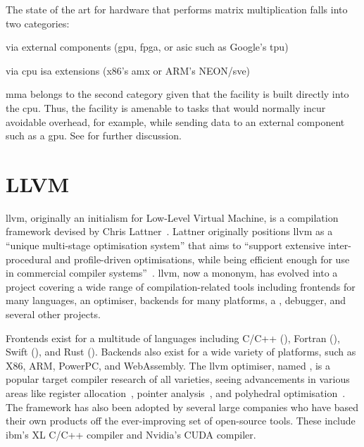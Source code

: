 \documentclass[\main/thesis.tex]{subfiles}
\begin{document}
The state of the art for hardware that performs matrix multiplication falls into two categories:
\begin{enumerate*}[itemjoin*={{ and }}, label=\textbf{(\arabic*)}, after={.}]
  \item via external components (\eg \gls{gpu}, \gls{fpga}, or \gls{asic} such as Google's \gls{tpu})
  \item via \gls{cpu} \gls{isa} extensions (\eg x86's \gls{amx} or ARM's NEON/\gls{sve})
\end{enumerate*}
\Gls{mma} belongs to the second category given that the facility is built directly into the \gls{cpu}.
Thus, the facility is amenable to tasks that would normally incur avoidable overhead, for example, while sending data to an external component such as a \gls{gpu}.
See  for further discussion.

\section{LLVM}
\label{sec:llvm}
\Gls{llvm}, originally an initialism for Low-Level Virtual Machine, is a compilation framework devised by Chris Lattner~\autocite{lattner2002llvm,lattner2004llvm}.
Lattner originally positions \gls{llvm} as a ``unique multi-stage optimisation system'' that aims to ``support extensive inter-procedural and profile-driven optimisations, while being efficient enough for use in commercial compiler systems''~\autocite{lattner2002llvm}.
\Gls{llvm}, now a mononym, has evolved into a project covering a wide range of compilation-related tools including frontends for many languages, an optimiser, backends for many platforms, a , debugger, and several other projects.

Frontends exist for a multitude of languages including C/C++ (), Fortran (), Swift (), and Rust ().
Backends also exist for a wide variety of platforms, such as X86, ARM, PowerPC, and WebAssembly.
The \gls{llvm} optimiser, named , is a popular target compiler research of all varieties, seeing advancements in various areas like register allocation~\autocite{lozano2019combinatorial,pereira2008register}, pointer analysis~\autocite{hardekopf2009semi,sui2016interprocedural}, and polyhedral optimisation~\autocite{grosser2011polly,alves2015runtime}.
The framework has also been adopted by several large companies who have based their own products off the ever-improving set of open-source tools.
These include \gls{ibm}'s XL C/C++ compiler and Nvidia's CUDA compiler.
\end{document}
